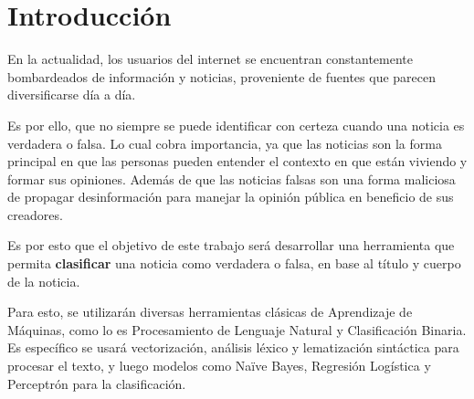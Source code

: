 \section{Introducción}
{

En la actualidad, los usuarios del internet se encuentran constantemente bombardeados de información y noticias, proveniente de fuentes que parecen diversificarse día a día. 

Es por ello, que no siempre se puede identificar con certeza cuando una noticia es verdadera o falsa. Lo cual cobra importancia, ya que las noticias son la forma principal en que las personas pueden entender el contexto en que están viviendo y formar sus opiniones. Además de que las noticias falsas son una forma maliciosa de propagar desinformación para manejar la opinión pública en beneficio de sus creadores. 

Es por esto que el objetivo de este trabajo será desarrollar una herramienta que permita \textbf{clasificar} una noticia como verdadera o falsa, en base al título y cuerpo de la noticia.

Para esto, se utilizarán diversas herramientas clásicas de Aprendizaje de Máquinas, como lo es Procesamiento de Lenguaje Natural y Clasificación Binaria. Es específico se usará vectorización, análisis léxico y lematización sintáctica para procesar el texto, y luego modelos como Naïve Bayes, Regresión Logística y Perceptrón para la clasificación. 


}

